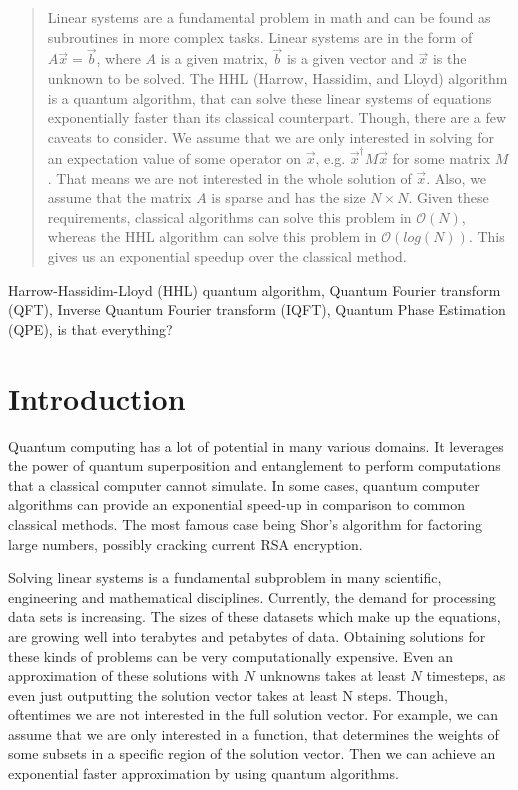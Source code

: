 \begin{abstract}
Linear systems are a fundamental problem in math and can be found as subroutines in more complex tasks.
Linear systems are in the form of $A \vec x = \vec b$, where $A$ is a given matrix, $\vec b$ is a given vector and $\vec x$ is the unknown to be solved.
The HHL (Harrow, Hassidim, and Lloyd) algorithm is a quantum algorithm, that can solve these linear systems of equations exponentially faster than its classical counterpart. 
Though, there are a few caveats to consider.
We assume that we are only interested in solving for an expectation value of some operator on $\vec x$, e.g. $\vec{x}^\dagger M \vec x$ for some matrix $M$.
That means we are not interested in the whole solution of $\vec x$.
Also, we assume that the matrix $A$ is sparse and has the size $N\times N$. 
Given these requirements, classical algorithms can solve this problem in $\mathcal{O}(N )$, whereas the HHL algorithm can solve this problem in $\mathcal{O}(log (N) )$.
This gives us an exponential speedup over the classical method.
\end{abstract}

\begin{IEEEkeywords}
Harrow-Hassidim-Lloyd (HHL) quantum algorithm, 
Quantum Fourier transform (QFT), 
Inverse Quantum Fourier transform (IQFT), 
Quantum Phase Estimation (QPE),
is that everything?
\end{IEEEkeywords}



\section{Introduction}


Quantum computing has a lot of potential in many various domains. 
It leverages the power of quantum superposition and entanglement to perform computations that a classical computer cannot simulate.
In some cases, quantum computer algorithms can provide an exponential speed-up in comparison to common classical methods.
The most famous case being Shor's algorithm for factoring large numbers, possibly cracking current RSA encryption.

Solving linear systems is a fundamental subproblem in many scientific, engineering and mathematical disciplines. 
Currently, the demand for processing data sets is increasing. 
The sizes of these datasets which make up the equations, are growing well into terabytes and petabytes of data.
Obtaining solutions for these kinds of problems can be very computationally expensive.
Even an approximation of these solutions with $N$ unknowns takes at least $N$ timesteps, as even just outputting the solution vector takes at least N steps.
Though, oftentimes we are not interested in the full solution vector. 
For example, we can assume that we are only interested in a function, that determines the weights of some subsets in a specific region of the solution vector.
Then we can achieve an exponential faster approximation by using quantum algorithms. 

